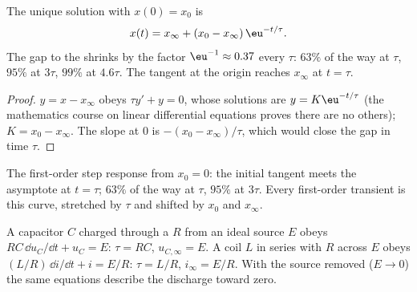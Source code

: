 \begin{theorem}[Solution]\label{thm:b1:transient-regimes:firstorder}
The unique solution with $x(0) = x_0$ is
\[
x(t) = x_\infty + (x_0 - x_\infty)\,\eu^{-t/\tau} .
\]
The gap to the  shrinks by the factor $\eu^{-1} \approx
0.37$ every $\tau$: $63\%$ of the way at $\tau$, $95\%$ at $3\tau$,
$99\%$ at $4.6\tau$. The tangent at the origin reaches $x_\infty$ at
$t = \tau$.
\end{theorem}

\begin{proof}
$y = x - x_\infty$ obeys $\tau y' + y = 0$, whose solutions are
$y = K\eu^{-t/\tau}$ (the mathematics course on linear differential
equations proves there are no others); $K = x_0 - x_\infty$. The slope
at $0$ is $-(x_0 - x_\infty)/\tau$, which would close the gap in time
$\tau$.
\end{proof}

\begin{omfigure}

{\small The first-order step response from $x_0 = 0$: the initial
tangent meets the asymptote at $t = \tau$; $63\%$ of the way at $\tau$,
$95\%$ at $3\tau$. Every first-order transient is this curve, stretched
by $\tau$ and shifted by $x_0$ and $x_\infty$.}
\end{omfigure}

\begin{proposition}\label{prop:b1:transient-regimes:rcrl}
A capacitor $C$ charged through a  $R$ from an ideal source $E$
obeys $RC\,\dd u_C/\dd t + u_C = E$: $\tau = RC$, $u_{C,\infty} = E$. A
coil $L$ in series with $R$ across $E$ obeys $(L/R)\,\dd i/\dd t + i =
E/R$: $\tau = L/R$, $i_\infty = E/R$. With the source removed
($E \to 0$) the same equations describe the discharge toward zero.
\end{proposition}

